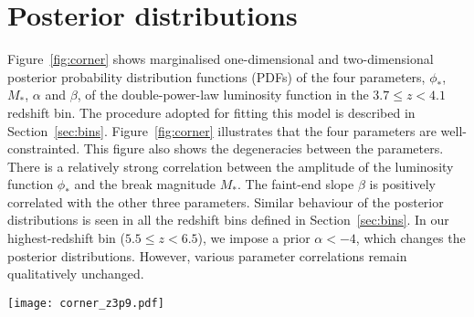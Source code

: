 \documentclass[fleqn,usenatbib]{mnras}
\begin{document}
\appendix

\section{Posterior distributions}

Figure~\ref{fig:corner} shows marginalised one-dimensional and
two-dimensional posterior probability distribution functions (PDFs) of
the four parameters, $\phi_*$, $M_*$, $\alpha$ and $\beta$, of the
double-power-law luminosity function in the $3.7\leq z < 4.1$ redshift
bin.  The procedure adopted for fitting this model is described in
Section~\ref{sec:bins}.  Figure~\ref{fig:corner} illustrates that the
four parameters are well-constrainted.  This figure also shows the
degeneracies between the parameters.  There is a relatively strong
correlation between the amplitude of the luminosity function $\phi_*$
and the break magnitude $M_*$.  The faint-end slope $\beta$ is
positively correlated with the other three parameters.  Similar
behaviour of the posterior distributions is seen in all the redshift
bins defined in Section~\ref{sec:bins}.  In our highest-redshift bin
($5.5\leq z < 6.5$), we impose a prior $\alpha < -4$, which changes
the posterior distributions.  However, various parameter correlations
remain qualitatively unchanged.

\begin{figure*}
  \begin{center}
    \texttt{[image: corner\_z3p9.pdf]}
  \end{center}
  \caption{Posterior distributions of the four double-power-law
    parameters in the $3.7\leq z < 4.1$ redshift bin.  The blue
    squares indicate median values.  Similar behaviour of the
    posterior distributions is seen in all other redshift bins defined
    in Section~\ref{sec:bins}.
    \label{fig:corner}}
\end{figure*}
\end{document}
